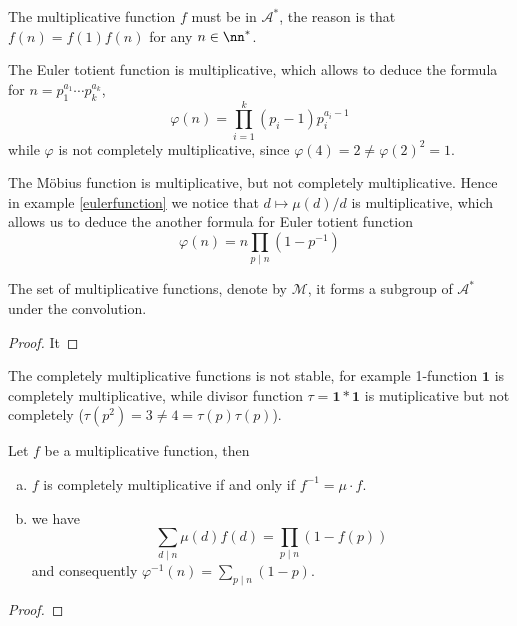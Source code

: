 \begin{remark}
    The multiplicative function \(f \) must be in \(\mathcal{A}^*\), the reason is that \(f(n) = f(1)f(n)\) for any \(n \in \nn^*\).
\end{remark}

\begin{example}
    The Euler totient function is multiplicative, which allows to deduce the formula for \(n = p_1^{a_1} \cdots p_k^{a_k}\),
    \[\varphi(n) = \prod_{i = 1}^k (p_i - 1)p_i^{a_i-1}\]
    while \(\varphi\) is not completely multiplicative, since \(\varphi(4) = 2 \neq \varphi(2)^2 = 1\).
\end{example}

\begin{example}
    The Möbius function is multiplicative, but not completely multiplicative. Hence in example \ref{eulerfunction} we notice that \(d \mapsto \mu(d)/d\) is multiplicative, which allows us to deduce the another formula for Euler totient function
    \[\varphi(n) = n \prod_{p \mid n}(1-p^{-1})\]

\end{example}

\begin{colortheorem}
    The set of multiplicative functions, denote by \(\mathcal{M}\), it forms a subgroup of \(\mathcal{A}^*\) under the convolution.
\end{colortheorem}

\begin{proof}
    It
\end{proof}

\begin{remark}
    The completely multiplicative functions is not stable, for example 1-function \(\mathbf{1}\) is completely multiplicative, while divisor function \(\tau = \mathbf{1} * \mathbf{1}\) is mutiplicative but not completely (\(\tau(p^2) = 3 \neq 4 = \tau(p)\tau(p)\)).
\end{remark}

\begin{proposition}
    Let \(f\) be a multiplicative function, then 
    \begin{enumerate}[(a)]
        \item \(f\) is completely multiplicative if and only if \(f^{-1} = \mu \cdot f\).
        \item we have
        \[\sum_{d \mid n }\mu(d)f(d) = \prod_{p \mid n}(1-f(p))\]
        and consequently \(\varphi^{-1}(n) = \sum_{p \mid n }(1-p)\).
    \end{enumerate}
\end{proposition}
\begin{proof}
    
\end{proof}

